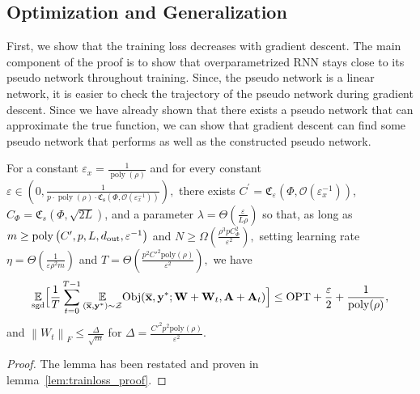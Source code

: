 \subsection{Optimization and Generalization}\label{sec:optim_general}

First, we show that the training loss decreases with gradient descent. The main component of the proof is to show that overparametrized RNN stays close to its pseudo network throughout training. Since, the pseudo network is a linear network, it is easier to check the trajectory of the pseudo network during gradient descent. Since we have already shown that there exists a pseudo network that can approximate the true function, we can show that gradient descent can find some pseudo network that performs as well as the constructed pseudo network. 
\begin{lemma}\label{lem:trainloss}
   For a constant $\varepsilon_x = \frac{1}{\operatorname{poly}(\rho)}$ and for every constant $\varepsilon \in \left(0, \frac{1}{p \cdot \operatorname{poly}(\rho) \cdot \mathfrak{C}_{\mathfrak{s}}(\Phi, \mathcal{O}(\varepsilon_x^{-1}))}\right),$ there exists $C^{\prime}=\mathfrak{C}_{\varepsilon}(\Phi, \mathcal{O}(\varepsilon_x^{-1}))$, $C_{\Phi} = \mathfrak{C}_{s}(\Phi, \sqrt{2L})$, and a parameter $\lambda=\Theta\left(\frac{\varepsilon}{L \rho}\right)$
so that, as long as $m \geq \operatorname{poly}\left(C', p, L, d_{\mathrm{out}} , \varepsilon^{-1}\right)$ and $N \geq \Omega\left(\frac{\rho^{3} p C_{\Phi}^2}{\varepsilon^2}\right),$ setting learning rate $\eta=\Theta\left(\frac{1}{\varepsilon \rho^{2} m}\right)$ and
$T=\Theta\left(\frac{p^{2}  C'^2 \mathrm{poly}(\rho)}{\varepsilon^{2}}\right),$ we have
\begin{align*}
\underset{\mathrm{sgd}}{\mathbb{E}}\Big[\frac{1}{T} \sum_{t=0}^{T-1}  \underset{(\overline{\mathbf{x}}, \mathbf{y}^{\ast}) \sim \mathcal{Z}}{\mathbb{E}} \mathrm{Obj}(\overline{\mathbf{x}}, \mathbf{y}^{\ast};  \mathbf{W}+\mathbf{W}_{t}, \mathbf{A} + \mathbf{A}_t) \Big] \leq \mathrm{OPT} + \frac{\varepsilon}{2} + \frac{1}{\mathrm{poly}(\rho)},
\end{align*}
and $\left\|W_{t}\right\|_{F} \leq \frac{\Delta}{\sqrt{m}}$ for $\Delta=\frac{C'^{2} p^{2} \mathrm { poly }(\rho)}{\varepsilon^{2}}$.
\end{lemma}

\begin{proof}
	The lemma has been restated and proven in lemma~\ref{lem:trainloss_proof}.
\end{proof}

